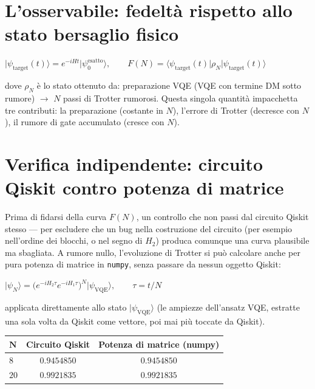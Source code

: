 \documentclass[11pt,a4paper]{article}
\newcommand{\ket}[1]{\lvert #1 \rangle}
\newcommand{\bra}[1]{\langle #1 \rvert}
\begin{document}
\section{L'osservabile: fedeltà rispetto allo stato bersaglio fisico}

\begin{keyeq}
\centering
$\ket{\psi_\text{target}(t)} = e^{-iHt}\ket{\psi_0^\text{esatto}}, \qquad
F(N) = \bra{\psi_\text{target}(t)}\rho_N\ket{\psi_\text{target}(t)}$
\end{keyeq}
dove $\rho_N$ è lo stato ottenuto da: preparazione VQE (VQE con termine
DM sotto rumore) $\to$ $N$ passi di Trotter rumorosi. Questa singola
quantità impacchetta tre contributi: la preparazione (costante in $N$),
l'errore di Trotter (decresce con $N$), il rumore di gate accumulato
(cresce con $N$).

\section{Verifica indipendente: circuito Qiskit contro potenza di matrice}
\label{sec:cross-check-numpy}

Prima di fidarsi della curva $F(N)$, un controllo che non passi dal
circuito Qiskit stesso --- per escludere che un bug nella costruzione
del circuito (per esempio nell'ordine dei blocchi, o nel segno di
$H_2$) produca comunque una curva plausibile ma sbagliata. A rumore
nullo, l'evoluzione di Trotter si può calcolare anche per pura potenza
di matrice in \texttt{numpy}, senza passare da nessun oggetto Qiskit:
\begin{keyeq}
\centering
$\ket{\psi_N} = \Big(e^{-iH_2\tau}e^{-iH_1\tau}\Big)^N \ket{\psi_\text{VQE}},
\qquad \tau=t/N$
\end{keyeq}
applicata direttamente allo stato $\ket{\psi_\text{VQE}}$ (le ampiezze
dell'ansatz VQE, estratte una sola volta da Qiskit come vettore, poi mai
più toccate da Qiskit).

\begin{center}
\renewcommand{\arraystretch}{1.25}
\begin{tabular}{@{}lcc@{}}
\toprule
$\boldsymbol{N}$ & \textbf{Circuito Qiskit} & \textbf{Potenza di matrice (numpy)}\\
\midrule
$8$ & $0.9454850$ & $0.9454850$\\
$20$ & $0.9921835$ & $0.9921835$\\
\bottomrule
\end{tabular}
\end{center}
\end{document}
